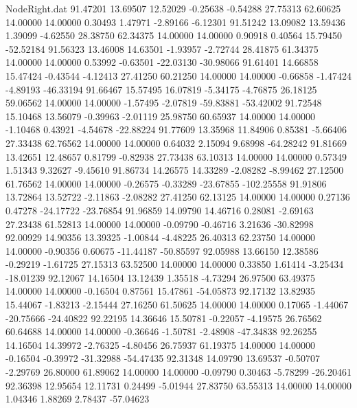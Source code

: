 \begin{filecontents}{NodeRight.dat}
  91.47201   13.69507   12.52029    -0.25638   -0.54288   27.75313   62.60625   14.00000   14.00000    0.30493    1.47971   -2.89166   -6.12301
  91.51242   13.09082   13.59436     1.39099   -4.62550   28.38750   62.34375   14.00000   14.00000    0.90918    0.40564   15.79450  -52.52184
  91.56323   13.46008   14.63501    -1.93957   -2.72744   28.41875   61.34375   14.00000   14.00000    0.53992   -0.63501  -22.03130  -30.98066
  91.61401   14.66858   15.47424    -0.43544   -4.12413   27.41250   60.21250   14.00000   14.00000   -0.66858   -1.47424   -4.89193  -46.33194
  91.66467   15.57495   16.07819    -5.34175   -4.76875   26.18125   59.06562   14.00000   14.00000   -1.57495   -2.07819  -59.83881  -53.42002
  91.72548   15.10468   13.56079    -0.39963   -2.01119   25.98750   60.65937   14.00000   14.00000   -1.10468    0.43921   -4.54678  -22.88224
  91.77609   13.35968   11.84906     0.85381   -5.66406   27.33438   62.76562   14.00000   14.00000    0.64032    2.15094    9.68998  -64.28242
  91.81669   13.42651   12.48657     0.81799   -0.82938   27.73438   63.10313   14.00000   14.00000    0.57349    1.51343    9.32627   -9.45610
  91.86734   14.26575   14.33289    -2.08282   -8.99462   27.12500   61.76562   14.00000   14.00000   -0.26575   -0.33289  -23.67855 -102.25558
  91.91806   13.72864   13.52722    -2.11863   -2.08282   27.41250   62.13125   14.00000   14.00000    0.27136    0.47278  -24.17722  -23.76854
  91.96859   14.09790   14.46716     0.28081   -2.69163   27.23438   61.52813   14.00000   14.00000   -0.09790   -0.46716    3.21636  -30.82998
  92.00929   14.90356   13.39325    -1.00844   -4.48225   26.40313   62.23750   14.00000   14.00000   -0.90356    0.60675  -11.44187  -50.85597
  92.05988   13.66150   12.38586    -0.29219   -1.61725   27.15313   63.52500   14.00000   14.00000    0.33850    1.61414   -3.25434  -18.01239
  92.12067   14.16504   13.12439     1.35518   -4.73294   26.97500   63.49375   14.00000   14.00000   -0.16504    0.87561   15.47861  -54.05873
  92.17132   13.82935   15.44067    -1.83213   -2.15444   27.16250   61.50625   14.00000   14.00000    0.17065   -1.44067  -20.75666  -24.40822
  92.22195   14.36646   15.50781    -0.22057   -4.19575   26.76562   60.64688   14.00000   14.00000   -0.36646   -1.50781   -2.48908  -47.34838
  92.26255   14.16504   14.39972    -2.76325   -4.80456   26.75937   61.19375   14.00000   14.00000   -0.16504   -0.39972  -31.32988  -54.47435
  92.31348   14.09790   13.69537    -0.50707   -2.29769   26.80000   61.89062   14.00000   14.00000   -0.09790    0.30463   -5.78299  -26.20461
  92.36398   12.95654   12.11731     0.24499   -5.01944   27.83750   63.55313   14.00000   14.00000    1.04346    1.88269    2.78437  -57.04623

\end{filecontents}
